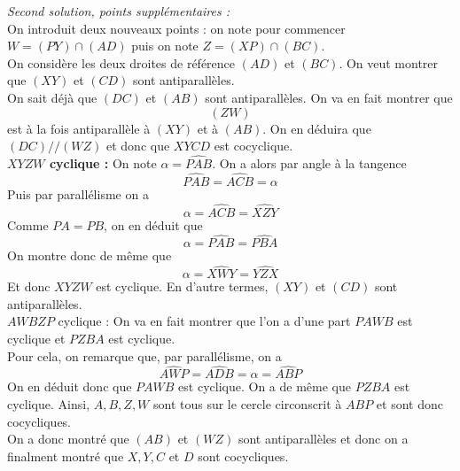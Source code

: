 \begin{sol}
\textit{Second solution, points supplémentaires :} \\
On introduit deux nouveaux points : on note pour commencer $W=(PY)\cap (AD)$ puis on note $Z=(XP)\cap (BC)$. \\
On considère les deux droites de référence $(AD)$ et $(BC)$. On veut montrer que $(XY)$ et $(CD)$ sont antiparallèles. \\
On sait déjà que $(DC)$ et $(AB)$ sont antiparallèles. On va en fait montrer que
$$(ZW)$$
est à la fois antiparallèle à $(XY)$ et à $(AB)$. On en déduira que $(DC)//(WZ)$ et donc que $XYCD$ est cocyclique. \\
\textbf{$XYZW$ cyclique :} On note $\alpha = \widehat{PAB}$. On a alors par angle à la tangence
$$\widehat{PAB}=\widehat{ACB}=\alpha $$
Puis par parallélisme on a
$$\alpha=\widehat{ACB}=\widehat{XZY} $$
Comme $PA=PB$, on en déduit que
$$\alpha=\widehat{PAB}=\widehat{PBA} $$
On montre donc de même que
$$\alpha=\widehat{XWY}=\widehat{YZX} $$
Et donc $XYZW$ est cyclique. En d'autre termes, $(XY)$ et $(CD)$ sont antiparallèles. \\
$AWBZP$ cyclique : On va en fait montrer que l'on a d'une part $PAWB$ est cyclique et $PZBA$ est cyclique. \\
Pour cela, on remarque que, par parallélisme, on a
$$\widehat{AWP} = \widehat{ADB} = \alpha = \widehat{ABP} $$
On en déduit donc que $PAWB$ est cyclique. On a de même que $PZBA$ est cyclique. Ainsi, $A,B,Z,W$ sont tous sur le cercle circonscrit à $ABP$ et sont donc cocycliques. \\
On a donc montré que $(AB)$ et $(WZ)$ sont antiparallèles et donc on a finalment montré que $X,Y,C$ et $D$ sont cocycliques.
\end{sol}
